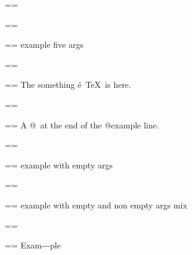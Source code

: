 \documentclass{book}
\makeatletter
\newenvironment{Texinfopreformatted}{%
  \par\GNUTobeylines\obeyspaces\frenchspacing\parskip=\z@\parindent=\z@}{}
{\catcode`\^^M=13 \gdef\GNUTobeylines{\catcode`\^^M=13 \def^^M{\null\par}}}
\newenvironment{Texinfoindented}{\begin{list}{}{}\item\relax}{\end{list}}
\renewcommand{\_}{\Texinfounderscore\discretionary{}{}{}}
\makeatother
\begin{document}
{{\begin{Texinfoindented}
\begin{Texinfoindented}
\begin{Texinfopreformatted}
\end{Texinfopreformatted}
\end{Texinfoindented}
\begin{Texinfopreformatted}%
\ttfamily 
\end{Texinfopreformatted}
\begin{Texinfoindented}
\begin{Texinfopreformatted}%
\ttfamily example five args
\end{Texinfopreformatted}
\end{Texinfoindented}
\begin{Texinfopreformatted}%
\ttfamily 
\end{Texinfopreformatted}
\begin{Texinfoindented}
\begin{Texinfopreformatted}%
\ttfamily The something \'{e}\ \TeX{}\ is here.
\end{Texinfopreformatted}
\end{Texinfoindented}
\begin{Texinfopreformatted}%
\ttfamily 
\end{Texinfopreformatted}
\begin{Texinfoindented}
\begin{Texinfopreformatted}%
\ttfamily A @\ at the end of the @example line.
\end{Texinfopreformatted}
\end{Texinfoindented}
\begin{Texinfopreformatted}%
\ttfamily 
\end{Texinfopreformatted}
\begin{Texinfoindented}
\begin{Texinfopreformatted}%
\ttfamily example with empty args
\end{Texinfopreformatted}
\end{Texinfoindented}
\begin{Texinfopreformatted}%
\ttfamily 
\end{Texinfopreformatted}
\begin{Texinfoindented}
\begin{Texinfopreformatted}%
\ttfamily example with empty and non empty args mix
\end{Texinfopreformatted}
\end{Texinfoindented}
\begin{Texinfopreformatted}%
\ttfamily 
\end{Texinfopreformatted}
\begin{Texinfoindented}
\begin{Texinfopreformatted}%
\ttfamily Exam{-}{-}{-}ple


\end{Texinfopreformatted}
\end{Texinfoindented}
\end{Texinfoindented}}}
\end{document}
